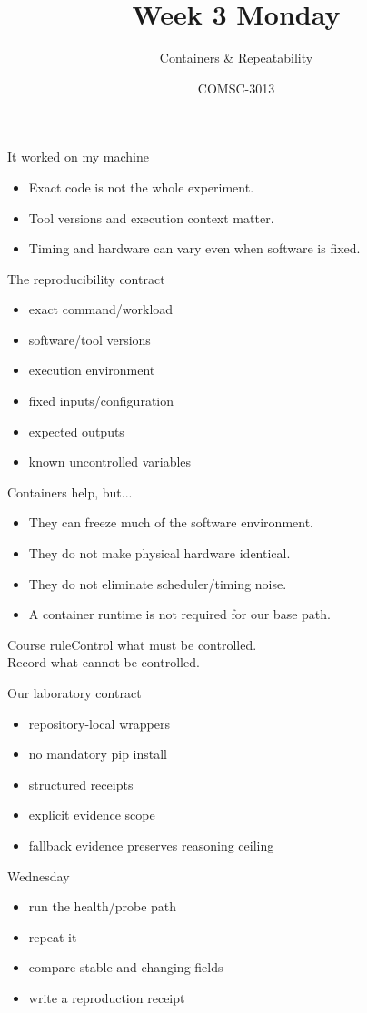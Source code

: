 \documentclass{beamer}
\title{Week 3 Monday}\subtitle{Containers \& Repeatability}\author{COMSC-3013}\date{}
\begin{document}
\begin{frame}\titlepage\end{frame}
\begin{frame}{It worked on my machine}\begin{itemize}\item Exact code is not the whole experiment.\item Tool versions and execution context matter.\item Timing and hardware can vary even when software is fixed.\end{itemize}\end{frame}
\begin{frame}{The reproducibility contract}\begin{itemize}\item exact command/workload\item software/tool versions\item execution environment\item fixed inputs/configuration\item expected outputs\item known uncontrolled variables\end{itemize}\end{frame}
\begin{frame}{Containers help, but...}\begin{itemize}\item They can freeze much of the software environment.\item They do not make physical hardware identical.\item They do not eliminate scheduler/timing noise.\item A container runtime is not required for our base path.\end{itemize}\end{frame}
\begin{frame}{Course rule}\centering\Large Control what must be controlled.\\[1em]Record what cannot be controlled.\end{frame}
\begin{frame}{Our laboratory contract}\begin{itemize}\item repository-local wrappers\item no mandatory pip install\item structured receipts\item explicit evidence scope\item fallback evidence preserves reasoning ceiling\end{itemize}\end{frame}
\begin{frame}{Wednesday}\begin{itemize}\item run the health/probe path\item repeat it\item compare stable and changing fields\item write a reproduction receipt\end{itemize}\end{frame}
\end{document}

